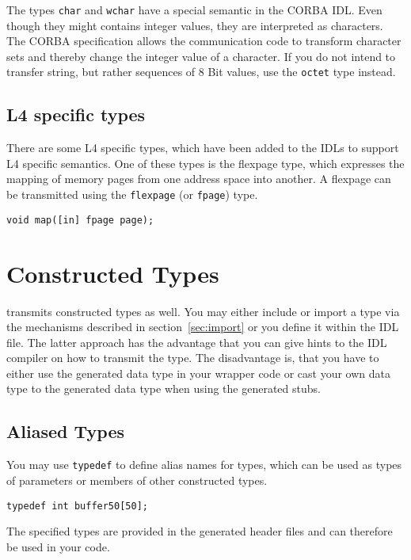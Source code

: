 The types {\tt char} and {\tt wchar} have a special semantic in the CORBA IDL.
Even though they might contains integer values, they are interpreted as
characters. The CORBA specification allows the communication code to transform
character sets and thereby change the integer value of a character. If you do
not intend to transfer string, but rather sequences of 8 Bit values, use the
{\tt octet} type instead.

\subsection{L4 specific types}

There are some L4 specific types, which have been added to the IDLs to support
L4 specific semantics.  One of these types is the flexpage type, which
expresses the mapping of memory pages from one address space into another.  A
flexpage can be transmitted using the {\tt flexpage} (or {\tt fpage}) type.

\begin{verbatim}
void map([in] fpage page);
\end{verbatim}

\section{Constructed Types}

\dice{} transmits constructed types as well. You may either include or import
a type via the mechanisms described in section~\ref{sec:import} or you define
it within the IDL file. The latter approach has the advantage that you can
give hints to the IDL compiler on how to transmit the type. The disadvantage
is, that you have to either use the generated data type in your wrapper code
or cast your own data type to the generated data type when using the generated
stubs.

\subsection{Aliased Types}

You may use {\tt typedef} to define alias names for types, which can be used
as types of parameters or members of other constructed types.

\begin{verbatim}
typedef int buffer50[50];
\end{verbatim}

The specified types are provided in the generated header files and can
therefore be used in your code.

